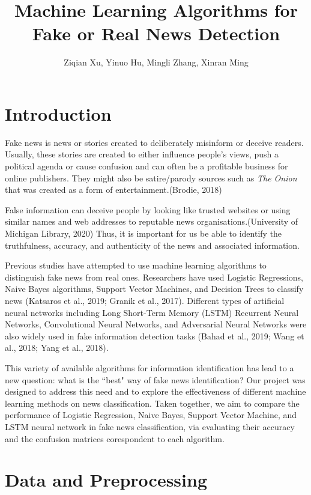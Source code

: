 \documentclass{article}
\title{Machine Learning Algorithms for Fake or Real News Detection}
\author{Ziqian Xu, Yinuo Hu, Mingli Zhang, Xinran Ming}
\date{}
\begin{document}
\maketitle


\begin{multicols}{2}
\section{Introduction}

Fake news is news or stories created to deliberately misinform or deceive readers. Usually, these stories are created to either influence people’s views, push a political agenda or cause confusion and can often be a profitable business for online publishers. They might also be satire/parody sources such as \emph{The Onion} that was created as a form of entertainment.(Brodie, 2018) 

False information can deceive people by looking like trusted websites or using similar names and web addresses to reputable news organisations.(University of Michigan Library, 2020) Thus, it is important for us be able to identify the truthfulness, accuracy, and authenticity of the news and associated information.\par

Previous studies have attempted to use machine learning algorithms to distinguish fake news from real ones. Researchers have used Logistic Regressions, Naive Bayes algorithms, Support Vector Machines, and Decision Trees to classify news (Katsaros et al., 2019; Granik et al., 2017). Different types of artificial neural networks including Long Short-Term Memory (LSTM) Recurrent Neural Networks, Convolutional Neural Networks, and Adversarial Neural Networks were also widely used in fake information detection tasks (Bahad et al., 2019; Wang et al., 2018; Yang et al., 2018). \par

This variety of available algorithms for information identification has lead to a new question: what is the ``best" way of fake news identification? Our project was designed to address this need and to explore the effectiveness of different machine learning methods on news classification. Taken together, we aim to compare the performance of Logistic Regression, Naive Bayes, Support Vector Machine, and LSTM neural network in fake news classification, via evaluating their accuracy and the confusion matrices corespondent to each algorithm.


\section{Data and Preprocessing}


\end{multicols}
\end{document}
